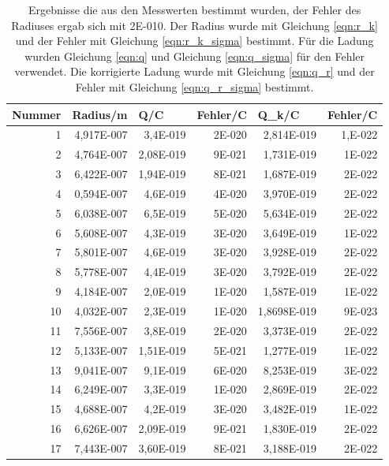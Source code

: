 \documentclass[12pt]{scrartcl}
\begin{document}
\begin{table}[H]
\caption{Ergebnisse die aus den Messwerten bestimmt wurden, der Fehler des Radiuses ergab sich mit 2E-010. Der Radius wurde mit Gleichung \ref{eqn:r_k} und der Fehler mit Gleichung \ref{eqn:r_k_sigma} bestimmt. Für die Ladung wurden Gleichung \ref{eqn:q} und Gleichung \ref{eqn:q_sigma} für den Fehler verwendet. Die korrigierte Ladung wurde mit Gleichung \ref{eqn:q_r} und der Fehler mit Gleichung \ref{eqn:q_r_sigma} bestimmt.}
\begin{center}
\begin{tabular}{|r|r|r|r|r|r|}
\hline
\multicolumn{1}{|l|}{Nummer} & \multicolumn{1}{|l|}{Radius/m} & \multicolumn{1}{l|}{Q/C} & \multicolumn{1}{l|}{Fehler/C} & \multicolumn{1}{l|}{Q\_k/C} & \multicolumn{1}{l|}{Fehler/C} \\ \hline
1 & 4,917E-007 & 3,4E-019 & 2E-020 & 2,814E-019 & 1,E-022 \\ \hline
2 & 4,764E-007 & 2,08E-019 & 9E-021 & 1,731E-019 & 1E-022 \\ \hline
3 & 6,422E-007 & 1,94E-019 & 8E-021 & 1,687E-019 & 2E-022 \\ \hline
4 & 0,594E-007 & 4,6E-019 & 4E-020 & 3,970E-019 & 2E-022 \\ \hline
5 & 6,038E-007 & 6,5E-019 & 5E-020 & 5,634E-019 & 2E-022 \\ \hline
6 & 5,608E-007 & 4,3E-019 & 3E-020 & 3,649E-019 & 1E-022 \\ \hline
7 & 5,801E-007 & 4,6E-019 & 3E-020 & 3,928E-019 & 2E-022 \\ \hline
8 & 5,778E-007 & 4,4E-019 & 3E-020 & 3,792E-019 & 2E-022 \\ \hline
9 & 4,184E-007 & 2,0E-019 & 1E-020 & 1,587E-019 & 1E-022 \\ \hline
10 & 4,032E-007 & 2,3E-019 & 1E-020 & 1,8698E-019 & 9E-023 \\ \hline
11 & 7,556E-007 & 3,8E-019 & 2E-020 & 3,373E-019 & 2E-022 \\ \hline
12 & 5,133E-007 & 1,51E-019 & 5E-021 & 1,277E-019 & 1E-022 \\ \hline
13 & 9,041E-007 & 9,1E-019 & 6E-020 & 8,253E-019 & 3E-022 \\ \hline
14 & 6,249E-007 & 3,3E-019 & 1E-020 & 2,869E-019 & 2E-022 \\ \hline
15 & 4,688E-007 & 4,2E-019 & 3E-020 & 3,482E-019 & 1E-022 \\ \hline
16 & 6,626E-007 & 2,09E-019 & 9E-021 & 1,830E-019 & 2E-022 \\ \hline
17 & 7,443E-007 & 3,60E-019 & 8E-021 & 3,188E-019 & 2E-022 \\ \hline

\end{tabular}
\end{center}
\end{table}
\end{document}
